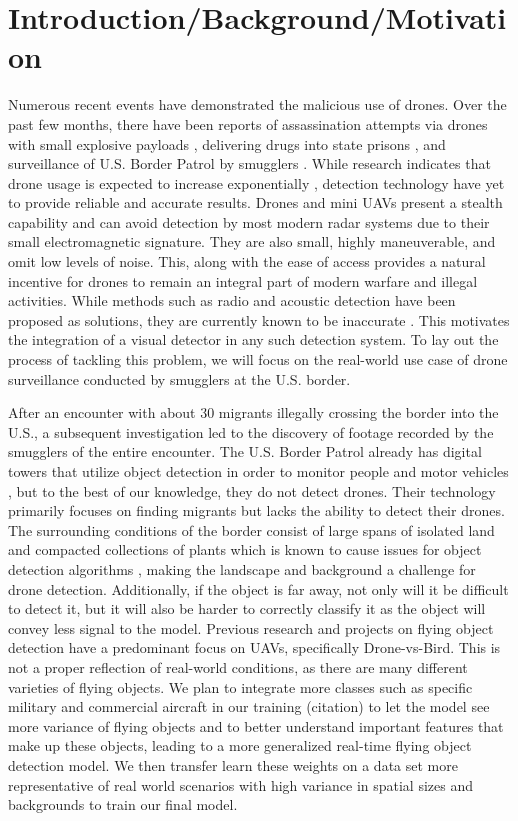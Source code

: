\documentclass[10pt,twocolumn,letterpaper]{article}
\begin{document}
\section{Introduction/Background/Motivation}
Numerous recent events have demonstrated the malicious use of drones. Over the past few months, there have been reports of assassination attempts via drones with small explosive payloads \cite{SuicideDrone}, delivering drugs into state prisons \cite{PrisonDrugs}, and surveillance of U.S. Border Patrol by smugglers \cite{BorderPatrol}. While research indicates that drone usage is expected to increase exponentially \cite{DroneMarket}, detection technology have yet to provide reliable and accurate results. Drones and mini UAVs present a stealth capability and can avoid detection by most modern radar systems due to their small electromagnetic signature. They are also small, highly maneuverable, and omit low levels of noise. This, along with the ease of access provides a natural incentive for drones to remain an integral part of modern warfare and illegal activities. While methods such as radio and acoustic detection have been proposed as solutions, they are currently known to be inaccurate \cite{Drone-Detection-Using-YOLOv5}. This motivates the integration of a visual detector in any such detection system. To lay out the process of tackling this problem, we will focus on the real-world use case of drone surveillance conducted by smugglers at the U.S. border.

After an encounter with about 30 migrants illegally crossing the border into the U.S., a subsequent investigation led to the discovery of footage recorded by the smugglers of the entire encounter. The U.S. Border Patrol already has digital towers that utilize object detection in order to monitor people and motor vehicles \cite{BorderDetection}, but to the best of our knowledge, they do not detect drones. Their technology primarily focuses on finding migrants but lacks the ability to detect their drones. The surrounding conditions of the border consist of large spans of isolated land and compacted collections of plants which is known to cause issues for object detection algorithms \cite{BorderDigitalTowers}, making the landscape and background a challenge for drone detection. Additionally, if the object is far away, not only will it be difficult to detect it, but it will also be harder to correctly classify it as the object will convey less signal to the model. Previous research and projects on flying object detection have a predominant focus on UAVs, specifically Drone-vs-Bird. This is not a proper reflection of real-world conditions, as there are many different varieties of flying objects. We plan to integrate more classes such as specific military and commercial aircraft in our training (citation) to let the model see more variance of flying objects and to better understand important features that make up these objects, leading to a more generalized real-time flying object detection model. We then transfer learn these weights on a data set more representative of real world scenarios with high variance in spatial sizes and backgrounds to train our final model.  
\end{document}
